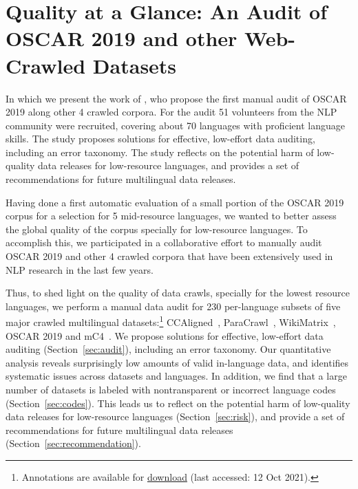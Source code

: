 \chapter{Quality at a Glance: An Audit of OSCAR 2019 and other Web-Crawled Datasets} \label{chap:quality}

\begin{center}
    \begin{minipage}{0.66\textwidth}
        \begin{small}
            In which we present the work of \citet{kreutzer-etal-2021-quality}, who propose the first manual audit of OSCAR 2019 along other 4 crawled corpora. For the audit 51 volunteers from the NLP community were recruited, covering about 70 languages with proficient language skills. The study proposes solutions for effective, low-effort data auditing, including an error taxonomy. The study reflects on the potential harm of low-quality data releases for low-resource languages, and provides a set of recommendations for future multilingual data releases.
        \end{small}
    \end{minipage}
    \vspace{0.5cm}
\end{center}

Having done a first automatic evaluation of a small portion of the OSCAR 2019 corpus for a selection for 5 mid-resource languages, we wanted to better assess the global quality of the corpus specially for low-resource languages. To accomplish this, we participated in a collaborative effort to manually audit OSCAR 2019 and other 4 crawled corpora that have been extensively used in NLP research in the last few years.

Thus, to shed light on the quality of data crawls, specially for the lowest resource languages, we perform a manual data audit for 230 per-language subsets of five major crawled multilingual datasets:\footnote{Annotations are available for \href{https://storage.googleapis.com/huggingface-nlp/datasets/masakhane_audit_annotations/masakhane_language_audit.zip}{download} (last accessed: 12 Oct 2021).}
CCAligned~\citep{el-kishky-etal-2020-ccaligned}, ParaCrawl~\citep{espla-etal-2019-paracrawl,banon-etal-2020-paracrawl}, WikiMatrix~\citep{schwenk-etal-2021-wikimatrix}, OSCAR 2019 \citep{ortiz-suarez-etal-2019-asynchronous, ortiz-suarez-etal-2020-monolingual} and mC4~\citep{xue-etal-2021-mt5}. We propose solutions for effective, low-effort data auditing (Section~\ref{sec:audit}), including an error taxonomy. Our quantitative analysis reveals surprisingly low amounts of valid in-language data, and identifies systematic issues across datasets and languages. In addition, we find that a large number of datasets is labeled with nontransparent or incorrect language codes (Section~\ref{sec:codes}). This leads us to reflect on the potential harm of low-quality data releases for low-resource languages (Section~\ref{sec:risk}), and provide a set of recommendations for future multilingual data releases (Section~\ref{sec:recommendation}).


